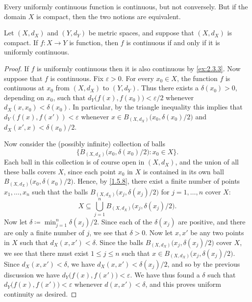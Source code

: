 \begin{note}
  Every uniformly continuous function is continuous, but not conversely.
  But if the domain \(X\) is compact, then the two notions are equivalent.
\end{note}

\begin{thm}\label{2.3.5}
  Let \((X, d_X)\) and \((Y, d_Y)\) be metric spaces, and suppose that \((X, d_X)\) is compact.
  If \(f : X \to Y\) is function, then \(f\) is continuous if and only if it is uniformly continuous.
\end{thm}

\begin{proof}
  If \(f\) is uniformly continuous then it is also continuous by \cref{ex:2.3.3}.
  Now suppose that \(f\) is continuous.
  Fix \(\varepsilon > 0\).
  For every \(x_0 \in X\), the function \(f\) is continuous at \(x_0\) from \((X, d_X)\) to \((Y, d_Y)\).
  Thus there exists a \(\delta(x_0) > 0\), depending on \(x_0\), such that \(d_Y\big(f(x), f(x_0)\big) < \varepsilon / 2\) whenever \(d_X(x, x_0) < \delta(x_0)\).
  In particular, by the triangle inequality this implies that \(d_Y(f(x), f(x')) < \varepsilon\) whenever \(x \in B_{(X, d_X)}\big(x_0, \delta(x_0) / 2\big)\) and \(d_X(x', x) < \delta(x_0) / 2\).

  Now consider the (possibly infinite) collection of balls
  \[
    \Big\{B_{(X, d_X)}\big(x_0, \delta(x_0) / 2\big) : x_0 \in X\Big\}.
  \]
  Each ball in this collection is of course open in \((X, d_X)\), and the union of all these balls covers \(X\), since each point \(x_0\) in \(X\) is contained in its own ball \(B_{(X, d_X)}\big(x_0, \delta(x_0) / 2\big)\).
  Hence, by \cref{1.5.8}, there exist a finite number of points \(x_1, \dots, x_n\) such that the balls \(B_{(X, d_X)}\big(x_j, \delta(x_j) / 2\big)\) for \(j = 1, \dots, n\) cover \(X\):
  \[
    X \subseteq \bigcup_{j = 1}^n B_{(X, d_X)}\big(x_j, \delta(x_j) / 2\big).
  \]
  Now let \(\delta \coloneqq \min_{j = 1}^n \delta(x_j) / 2\).
  Since each of the \(\delta(x_j)\) are positive, and there are only a finite number of \(j\), we see that \(\delta > 0\).
  Now let \(x, x'\) be any two points in \(X\) such that \(d_X(x, x') < \delta\).
  Since the balls \(B_{(X, d_X)}\big(x_j, \delta(x_j) / 2\big)\) cover \(X\), we see that there must exist \(1 \leq j \leq n\) such that \(x \in B_{(X, d_X)}\big(x_j, \delta(x_j) / 2\big)\).
  Since \(d_X(x, x') < \delta\), we have \(d_X(x, x') < \delta(x_j) / 2\), and so by the previous discussion we have \(d_Y\big(f(x), f(x')\big) < \varepsilon\).
  We have thus found a \(\delta\) such that \(d_Y\big(f(x), f(x')\big) < \varepsilon\) whenever \(d(x, x') < \delta\), and this proves uniform continuity as desired.
\end{proof}

